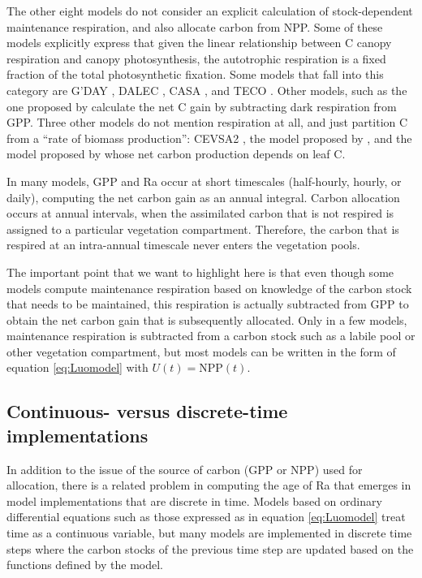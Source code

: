 \documentclass[bg, manuscript]{copernicus}
\begin{document}
The other eight models do not consider an explicit calculation of stock-dependent maintenance respiration, and also allocate carbon from NPP. Some of these models explicitly express that given the linear relationship between C canopy respiration and canopy photosynthesis, the autotrophic respiration is a fixed fraction of the total photosynthetic fixation. Some models that fall into this category are 
G'DAY \citep{Comins1993EA}, DALEC \citep{Williams2005GCB}, CASA \citep{Potter1993GlobalBiogeochemCy}, and TECO \citep{Luo2012TE}. Other models, such as the one proposed by \citet{Hilbert1991AnnBot} calculate the net C gain by subtracting dark respiration from GPP. Three other models do not mention respiration at all, and just partition C from a ``rate of biomass production'': CEVSA2 \citep{Gu2010EcologicalComplexity}, the model proposed by \citet{King1993TreePhysiol}, and the model proposed by \citet{DeAngelis2012TheorEcol} whose net carbon production depends on leaf C. 

In many models, GPP and Ra occur at short timescales (half-hourly, hourly, or daily), computing the net carbon gain as an annual integral. Carbon allocation occurs at annual intervals, when the assimilated carbon that is not respired is assigned to a particular vegetation compartment. Therefore, the carbon that is respired at an intra-annual timescale never enters the vegetation pools.

The important point that we want to highlight here is that even though some models compute maintenance respiration based on knowledge of the carbon stock that needs to be maintained, this respiration is actually subtracted from GPP to obtain the net carbon gain that is subsequently allocated. Only in a few models, maintenance respiration is subtracted from a carbon stock such as a labile pool or other vegetation compartment, but most models can be written in the form of equation \eqref{eq:Luomodel} with $U(t) = \mathrm{NPP}(t)$. 

\subsection{Continuous- versus discrete-time implementations}
In addition to the issue of the source of carbon (GPP or NPP) used for allocation, there is a related problem in computing the age of Ra that emerges in model implementations that are discrete in time. 
Models based on ordinary differential equations such as those expressed as in equation \eqref{eq:Luomodel} treat time as a continuous variable, but many models are implemented in discrete time steps where the carbon stocks of the previous time step are updated based on the functions defined by the model. %
\end{document}

